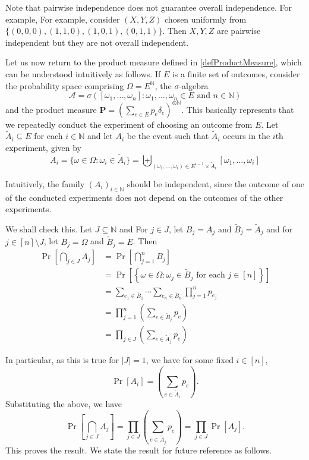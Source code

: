 Note that pairwise independence does not guarantee overall independence. For example, For example, consider $(X,Y,Z)$ chosen uniformly from $\{(0,0,0),(1,1,0),(1,0,1),(0,1,1)\}$. Then $X,Y,Z$ are pairwise independent but they are not overall independent.

\vspace{2mm}
Let us now return to the product measure defined in \ref{defProductMeasure}, which can be understood intuitively as follows. If $E$ is a finite set of outcomes, consider the probability space comprising $\Omega=E^\mathbb{N}$, the $\sigma$-algebra
$$\mathcal{A}=\sigma([\omega_1,\ldots,\omega_n]:\omega_1,\ldots,\omega_n\in E\text{ and }n\in\mathbb{N})$$
and the product measure $\textbf{P}=\left(\sum_{e\in E}p_e\delta_e\right)^{\otimes\mathbb{N}}$. This basically represents that we repeatedly conduct the experiment of choosing an outcome from $E$. Let $\tilde A_i\subseteq E$ for each $i\in\mathbb{N}$ and let $A_i$ be the event such that $\tilde A_i$ occurs in the $i$th experiment, given by
$$A_i = \{\omega\in\Omega:\omega_i\in\tilde A_i\}
  =\biguplus_{(\omega_1,\ldots,\omega_i)\in E^{i-1}\times \tilde A_i} [\omega_1,\ldots,\omega_i]$$

Intuitively, the family $(A_i)_{i\in\mathbb{N}}$ should be independent, since the outcome of one of the conducted experiments does not depend on the outcomes of the other experiments.

We shall check this. Let $J\subseteq\mathbb{N}$ and For $j\in J$, let $B_j=A_j$ and $\tilde B_j=\tilde A_j$ and for $j\in[n]\setminus J$, let $B_j=\Omega$ and $\tilde B_j=E$. Then
\begin{align*}
    \Pr\left[\bigcap_{j\in J}A_j\right] &= \Pr\left[\bigcap_{j=1}^n B_j\right] \\
    &= \Pr\left[\left\{\omega\in\Omega:\omega_j\in\tilde B_j\text{ for each }j\in[n]\right\}\right] \\
    &= \sum_{e_1\in\tilde B_1} \cdots \sum_{e_n\in\tilde B_n} \prod_{j=1}^n p_{e_j} \\
    &= \prod_{j=1}^n \left(\sum_{e\in\tilde B_j}p_e\right) \\
    &= \prod_{j\in J} \left(\sum_{e\in\tilde A_j}p_e\right)
\end{align*}

In particular, as this is true for $|J|=1$, we have for some fixed $i\in[n]$,
$$\Pr[A_i] = \left(\sum_{e\in\tilde A_i}p_e\right).$$
Substituting the above, we have
$$
\Pr\left[\bigcap_{j\in J}A_j\right] 
= \prod_{j\in J} \left(\sum_{e\in\tilde A_j}p_e\right)
= \prod_{j\in J} \Pr[A_j].
$$
This proves the result. We state the result for future reference as follows.

